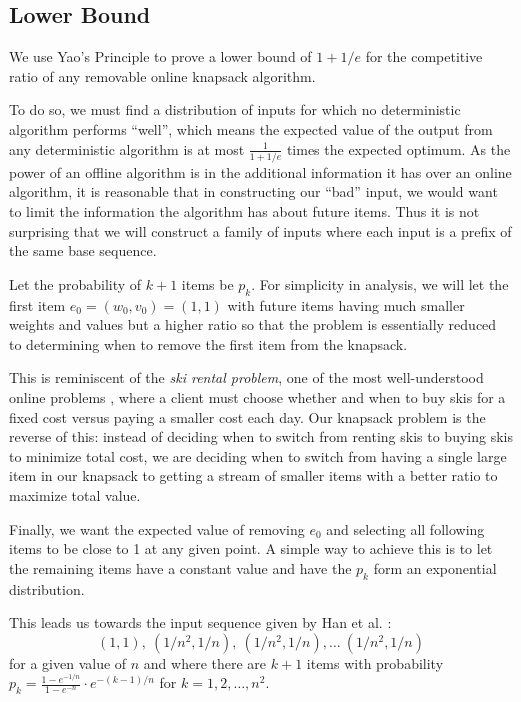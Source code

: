 \subsection{Lower Bound}
We use Yao's Principle to prove a lower bound of $1+1/e$ for the competitive ratio of any removable online knapsack algorithm.

To do so, we must find a distribution of inputs for which no deterministic algorithm performs ``well'', which means the expected value of the output from any deterministic algorithm is at most $\frac{1}{1+1/e}$ times the expected optimum. As the power of an offline algorithm is in the additional information it has over an online algorithm, it is reasonable that in constructing our ``bad'' input, we would want to limit the information the algorithm has about future items. Thus it is not surprising that we will construct a family of inputs where each input is a prefix of the same base sequence.

Let the probability of $k+1$ items be $p_k$. For simplicity in analysis, we will let the first item $e_0=(w_0,v_0)=(1,1)$ with future items having much smaller weights and values but a higher ratio so that the problem is essentially reduced to determining when to remove the first item from the knapsack.

This is reminiscent of the \emph{ski rental problem}, one of the most well-understood online problems \cite{karlin}, where a client must choose whether and when to buy skis for a fixed cost versus paying a smaller cost each day. Our knapsack problem is the reverse of this: instead of deciding when to switch from renting skis to buying skis to minimize total cost, we are deciding when to switch from having a single large item in our knapsack to getting a stream of smaller items with a better ratio to maximize total value.

Finally, we want the expected value of removing $e_0$ and selecting all following items to be close to 1 at any given point. A simple way to achieve this is to let the remaining items have a constant value and have the $p_k$ form an exponential distribution.

This leads us towards the input sequence given by Han et al. \cite{han}:
\[(1,1),\ (1/n^2,1/n),\ (1/n^2,1/n),\ldots\ (1/n^2,1/n)\]
for a given value of $n$ and where there are $k+1$ items with probability $p_k = \frac{1-e^{-1/n}}{1-e^{-n}} \cdot e^{-(k-1)/n}$ for $k=1,2,\ldots,n^2$.

